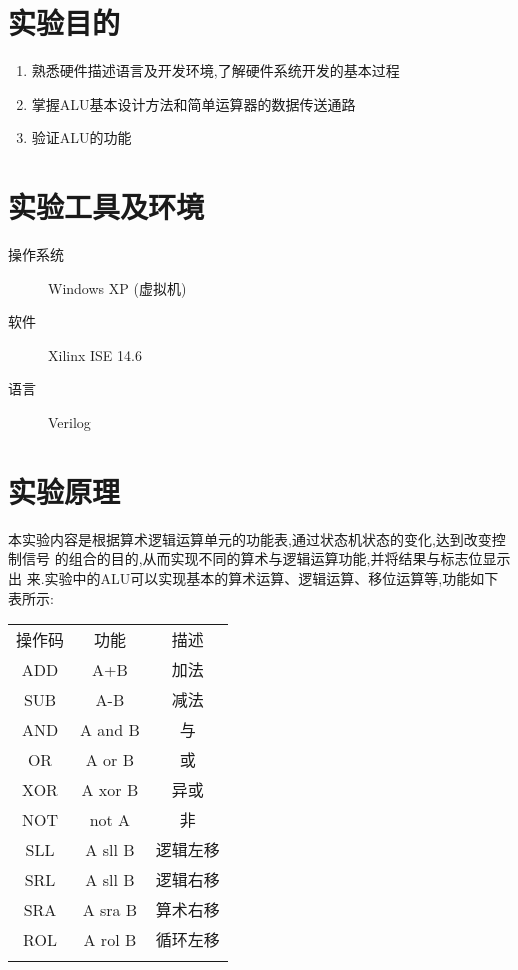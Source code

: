 
\section{实验目的}
\begin{enumerate}
  \item 熟悉硬件描述语言及开发环境,了解硬件系统开发的基本过程
  \item 掌握ALU基本设计方法和简单运算器的数据传送通路
  \item 验证ALU的功能
\end{enumerate}


\section{实验工具及环境}
\begin{description}
  \item[操作系统] Windows XP (虚拟机)
  \item[软件] Xilinx ISE 14.6
  \item[语言] Verilog
\end{description}

\section{实验原理}
本实验内容是根据算术逻辑运算单元的功能表,通过状态机状态的变化,达到改变控制信号
的组合的目的,从而实现不同的算术与逻辑运算功能,并将结果与标志位显示出
来.实验中的ALU可以实现基本的算术运算、逻辑运算、移位运算等,功能如下表所示:

\begin{table}[H]
\begin{center}
\begin{tabular}{|c|c|c|}
\shline
操作码 & 功能 & 描述\\ \shline
ADD & A+B & 加法\\ \hline
SUB & A-B & 减法\\ \hline
AND & A and B & 与\\ \hline
OR & A or B & 或\\ \hline
XOR & A xor B & 异或\\ \hline
NOT & not A & 非\\ \hline
SLL & A sll B & 逻辑左移\\ \hline
SRL & A sll B & 逻辑右移\\ \hline
SRA & A sra B & 算术右移\\ \hline
ROL & A rol B & 循环左移\\ \shline
\end{tabular}
\end{center}
\end{table}

